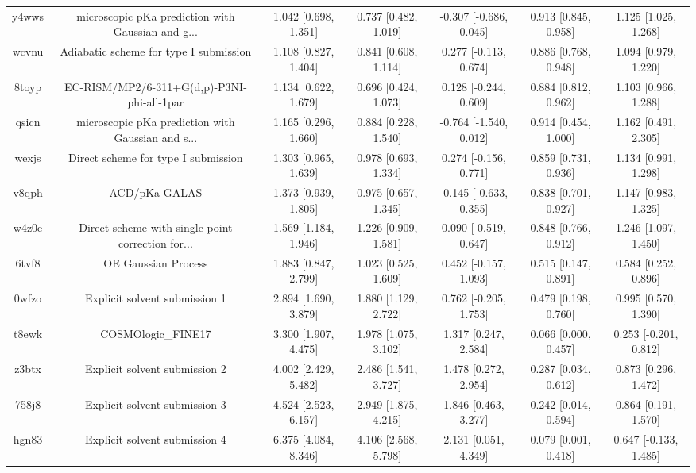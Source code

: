 \documentclass{article}
\begin{document}
\begin{center}
\begin{longtable}{|ccccccc|}
 y4wws &  microscopic pKa prediction with Gaussian and g... &  1.042 [0.698, 1.351] &  0.737 [0.482, 1.019] &  -0.307 [-0.686, 0.045] &  0.913 [0.845, 0.958] &   1.125 [1.025, 1.268] \\
 wcvnu &             Adiabatic scheme for type I submission &  1.108 [0.827, 1.404] &  0.841 [0.608, 1.114] &   0.277 [-0.113, 0.674] &  0.886 [0.768, 0.948] &   1.094 [0.979, 1.220] \\
 8toyp &         EC-RISM/MP2/6-311+G(d,p)-P3NI-phi-all-1par &  1.134 [0.622, 1.679] &  0.696 [0.424, 1.073] &   0.128 [-0.244, 0.609] &  0.884 [0.812, 0.962] &   1.103 [0.966, 1.288] \\
 qsicn &  microscopic pKa prediction with Gaussian and s... &  1.165 [0.296, 1.660] &  0.884 [0.228, 1.540] &  -0.764 [-1.540, 0.012] &  0.914 [0.454, 1.000] &   1.162 [0.491, 2.305] \\
 wexjs &                Direct scheme for type I submission &  1.303 [0.965, 1.639] &  0.978 [0.693, 1.334] &   0.274 [-0.156, 0.771] &  0.859 [0.731, 0.936] &   1.134 [0.991, 1.298] \\
 v8qph &                                      ACD/pKa GALAS &  1.373 [0.939, 1.805] &  0.975 [0.657, 1.345] &  -0.145 [-0.633, 0.355] &  0.838 [0.701, 0.927] &   1.147 [0.983, 1.325] \\
 w4z0e &  Direct scheme with single point correction for... &  1.569 [1.184, 1.946] &  1.226 [0.909, 1.581] &   0.090 [-0.519, 0.647] &  0.848 [0.766, 0.912] &   1.246 [1.097, 1.450] \\
 6tvf8 &                                OE Gaussian Process &  1.883 [0.847, 2.799] &  1.023 [0.525, 1.609] &   0.452 [-0.157, 1.093] &  0.515 [0.147, 0.891] &   0.584 [0.252, 0.896] \\
 0wfzo &                      Explicit solvent submission 1 &  2.894 [1.690, 3.879] &  1.880 [1.129, 2.722] &   0.762 [-0.205, 1.753] &  0.479 [0.198, 0.760] &   0.995 [0.570, 1.390] \\
 t8ewk &                                 COSMOlogic\_FINE17 &  3.300 [1.907, 4.475] &  1.978 [1.075, 3.102] &    1.317 [0.247, 2.584] &  0.066 [0.000, 0.457] &  0.253 [-0.201, 0.812] \\
 z3btx &                      Explicit solvent submission 2 &  4.002 [2.429, 5.482] &  2.486 [1.541, 3.727] &    1.478 [0.272, 2.954] &  0.287 [0.034, 0.612] &   0.873 [0.296, 1.472] \\
 758j8 &                      Explicit solvent submission 3 &  4.524 [2.523, 6.157] &  2.949 [1.875, 4.215] &    1.846 [0.463, 3.277] &  0.242 [0.014, 0.594] &   0.864 [0.191, 1.570] \\
 hgn83 &                      Explicit solvent submission 4 &  6.375 [4.084, 8.346] &  4.106 [2.568, 5.798] &    2.131 [0.051, 4.349] &  0.079 [0.001, 0.418] &  0.647 [-0.133, 1.485] \\
\end{longtable}
\end{center}
\end{document}
